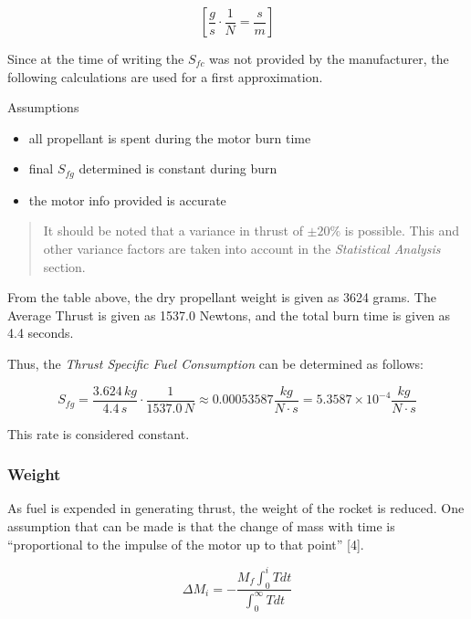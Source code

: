 \documentclass[]{article}
\providecommand{\tightlist}{%
  \setlength{\itemsep}{0pt}\setlength{\parskip}{0pt}}
\begin{document}
\begin{equation}
\left[ \dfrac{g}{s}\cdot \dfrac{1}{N} = \dfrac{s}{m} \right]  
\end{equation}

Since at the time of writing the \(S_{fc}\) was not provided by the
manufacturer, the following calculations are used for a first
approximation.

Assumptions

\begin{itemize}
\tightlist
\item
  all propellant is spent during the motor burn time
\item
  final \(S_{fg}\) determined is constant during burn
\item
  the motor info provided is accurate
\end{itemize}

\begin{quote}
It should be noted that a variance in thrust of \(\pm 20 \%\) is
possible. This and other variance factors are taken into account in the
\emph{Statistical Analysis} section.
\end{quote}

From the table above, the dry propellant weight is given as 3624 grams.
The Average Thrust is given as 1537.0 Newtons, and the total burn time
is given as 4.4 seconds.

Thus, the \emph{Thrust Specific Fuel Consumption} can be determined as
follows:

\begin{equation}
S_{fg} = \dfrac{3.624 \, kg}{4.4 \, s} \cdot \dfrac{1}{1537.0 \, N} \approx 0.00053587 \dfrac{kg}{N \cdot s} = 5.3587 \times 10^{-4} \dfrac{kg}{N \cdot s} 
\end{equation}

This rate is considered constant.

\subsubsection{Weight}\label{weight}

As fuel is expended in generating thrust, the weight of the rocket is
reduced. One assumption that can be made is that the change of mass with
time is ``proportional to the impulse of the motor up to that point''
{[}4{]}.

\begin{equation}
\label{eq_mass_burned}
\Delta M_i = - \dfrac{M_f \int^i_0 T dt}{\int^\infty_0 T dt}
\end{equation}
\end{document}

